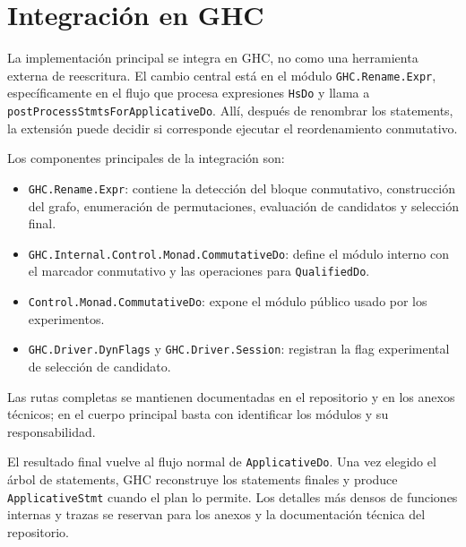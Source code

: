 
\section{Integración en GHC}

La implementación principal se integra en \textsf{GHC}, no como una herramienta externa de reescritura. El cambio central está en el módulo \texttt{GHC.Rename.Expr}, específicamente en el flujo que procesa expresiones \texttt{HsDo} y llama a \texttt{postProcessStmtsForApplicativeDo}. Allí, después de renombrar los statements, la extensión puede decidir si corresponde ejecutar el reordenamiento conmutativo.

Los componentes principales de la integración son:

\begin{itemize}
    \item \texttt{GHC.Rename.Expr}: contiene la detección del bloque conmutativo, construcción del grafo, enumeración de permutaciones, evaluación de candidatos y selección final.
    \item \texttt{GHC.Internal.Control.Monad.CommutativeDo}: define el módulo interno con el marcador conmutativo y las operaciones para \texttt{QualifiedDo}.
    \item \texttt{Control.Monad.CommutativeDo}: expone el módulo público usado por los experimentos.
    \item \texttt{GHC.Driver.DynFlags} y \texttt{GHC.Driver.Session}: registran la flag experimental de selección de candidato.
\end{itemize}

Las rutas completas se mantienen documentadas en el repositorio y en los anexos técnicos; en el cuerpo principal basta con identificar los módulos y su responsabilidad.

El resultado final vuelve al flujo normal de \texttt{ApplicativeDo}. Una vez elegido el árbol de statements, \textsf{GHC} reconstruye los statements finales y produce \texttt{ApplicativeStmt} cuando el plan lo permite. Los detalles más densos de funciones internas y trazas se reservan para los anexos y la documentación técnica del repositorio.
